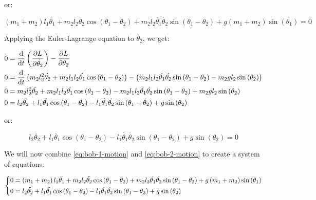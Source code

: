 or:

\begin{equation}
    \left(m_1 + m_2\right)l_1\ddot{\theta_1} + m_2l_2\ddot{\theta_2}\cos\left(\theta_1 - \theta_2\right) + m_2l_2\dot{\theta_1}\dot{\theta_2}\sin\left(\theta_1 - \theta_2\right) + g\left(m_1 + m_2\right)\sin\left(\theta_1\right) = 0
    \label{eq:bob-1-motion}
\end{equation}

Applying the Euler-Lagrange equation to $\theta_2$, we get:

\begin{align*}
    0 &= \diff[]{}{t}\left(\pdiff[]{L}{\dot{\theta_2}}\right) - \pdiff[]{L}{\theta_2}\\
    0 &= \diff[]{}{t}\left(m_2l_2^2\dot{\theta_2} + m_2l_1l_2\dot{\theta_1}\cos\left(\theta_1 - \theta_2\right)\right) - \left(m_2l_1l_2\dot{\theta_1}\dot{\theta_2}\sin\left(\theta_1 - \theta_2\right) - m_2gl_2\sin\left(\theta_2\right)\right)\\
    0 &= m_2l_2^2\ddot{\theta_2} + m_2l_1l_2\ddot{\theta_1}\cos\left(\theta_1 - \theta_2\right) - m_2l_1l_2\dot{\theta_1}\dot{\theta_2}\sin\left(\theta_1 - \theta_2\right) + m_2gl_2\sin\left(\theta_2\right)\\
    0 &= l_2\ddot{\theta_2} + l_1\ddot{\theta_1}\cos\left(\theta_1 - \theta_2\right) - l_1\dot{\theta_1}\dot{\theta_2}\sin\left(\theta_1 - \theta_2\right) + g\sin\left(\theta_2\right)
\end{align*}

or:

\begin{equation}
    l_2\ddot{\theta_2} + l_1\ddot{\theta_1}\cos\left(\theta_1 - \theta_2\right) - l_1\dot{\theta_1}\dot{\theta_2}\sin\left(\theta_1 - \theta_2\right) + g\sin\left(\theta_2\right) = 0
    \label{eq:bob-2-motion}
\end{equation}

We will now combine \eqref{eq:bob-1-motion} and \eqref{eq:bob-2-motion} to create a system of equations:

\begin{equation*}
    \begin{dcases}
        \begin{aligned}
            0 &= \left(m_1 + m_2\right)l_1\ddot{\theta_1} + m_2l_2\ddot{\theta_2}\cos\left(\theta_1 - \theta_2\right) + m_2l_2\dot{\theta_1}\dot{\theta_2}\sin\left(\theta_1 - \theta_2\right) + g\left(m_1 + m_2\right)\sin\left(\theta_1\right)\\
            0 &= l_2\ddot{\theta_2} + l_1\ddot{\theta_1}\cos\left(\theta_1 - \theta_2\right) - l_1\dot{\theta_1}\dot{\theta_2}\sin\left(\theta_1 - \theta_2\right) + g\sin\left(\theta_2\right)
        \end{aligned}
    \end{dcases}
\end{equation*}

